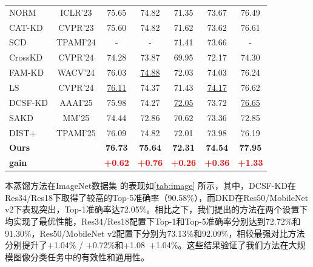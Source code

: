 \documentclass[10.5pt,letterpaper]{article}
\begin{document}
\begin{table}[htbp]
{\begin{tabular}{lcccccc}
			NORM\cite{liu-iclr2023-norm}	 &  ICLR'23  & 75.65    & 74.82    & 71.35    & 73.67   & 76.49		\\
			CAT-KD\cite{guo-cvpr2023-catbkd}	 &  CVPR'23  & 75.60    & 74.82    & 71.62    & 73.62   & 76.61		\\
			SCD \cite{yang-tpami2024-sckd}  &   TPAMI'24         & -   & -    & 71.41  & 73.66    & -    \\
			CrossKD  \cite{wang-cvpr2024-crosskd}  &CVPR'24    &74.28    &73.87     &69.95    &72.17&74.30\\
			FAM-KD \cite{pham-wacv2024-frequency}&  WACV'24  &76.03    & \underline{74.88}    & 72.03    & 74.03     & 76.24      \\
			LS\cite{sun-cvpr2024-lskd}  &CVPR'24			&\underline{76.11}   &  74.37    & 71.43  & \underline{74.17}   & 76.62  \\
			DCSF-KD\cite{tao-aaai2025-channelkd} &  AAAI'25 & 75.98   & 74.27    & \underline{72.05}  &73.72    &\underline{76.65}    \\
			SAKD\cite{li-acmmm2025-slakd} & MM'25 & 74.44  & 72.86  & 70.62 & 73.36 & 72.85 \\
			DIST+\cite{huang-tpami2025-dist}&TPAMI'25&76.09&74.82&72.01&73.98&76.19\\
			\bf Ours   &           &  \bf{76.73}    &   \bf{75.64}     &  \bf{72.31}   & \bf{74.54}   &    \bf{77.95}   \\
			 \bf gain   &           & \bf\textcolor{red}{+0.62}    &   \bf\textcolor{red}{+0.76}      &  \bf\textcolor{red}{+0.26}   &\bf \bf\textcolor{red}{+0.36}  &    \bf\textcolor{red}{+1.33}   \\
			\toprule[0.75pt]
		\end{tabular}%
	}

\end{table}
本蒸馏方法在ImageNet数据集\cite{krizhevsky-nips2012-imagenet} 的表现如\ref{tab:image} 所示，其中，DCSF-KD在Res34/Res18下取得了较高的Top-5准确率（90.58\%），而DKD在Res50/MobileNet v2下表现突出，Top-1准确率达72.05\%。相比之下，我们提出的方法在两个设置下均实现了最优性能，Res34/Res18配置下Top-1和Top-5准确率分别达到72.72\%和91.30\%，Res50/MobileNet v2配置下分别为73.13\%和92.09\%，相较最强对比方法分别提升了+1.04\% / +0.72\%和+1.08\ +1.04\%。这些结果验证了我们方法在大规模图像分类任务中的有效性和通用性。
\end{document}
